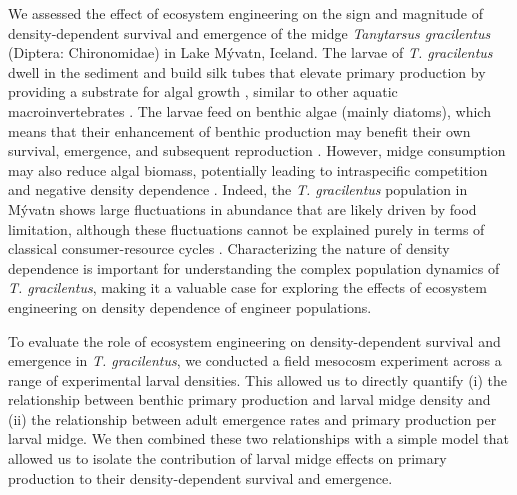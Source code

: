 We assessed the effect of ecosystem engineering on the sign and magnitude
of density-dependent survival and emergence of the midge \emph{Tanytarsus gracilentus} 
(Diptera: Chironomidae) in Lake M\'{y}vatn, Iceland. 
The larvae of \emph{T. gracilentus} dwell in the sediment and build silk tubes that 
elevate primary production by providing a substrate for algal growth 
\citep{herren2017, phillips2019},
similar to other aquatic macroinvertebrates 
\citep{largaespada2012,donadi2014,hoelker2015}.
The larvae feed on benthic algae (mainly diatoms), 
which means that their enhancement of benthic production may benefit their own 
survival, emergence, and subsequent reproduction \citep{ingvason2004}.
However, midge consumption may also reduce algal biomass,
potentially leading to intraspecific competition and negative density dependence 
\citep{einarsson2016}.
Indeed, the \emph{T. gracilentus} population 
in M\'{y}vatn shows large fluctuations in abundance 
that are likely driven by food limitation, although these fluctuations cannot be explained 
purely in terms of classical consumer-resource cycles \citep{ives2008}.
Characterizing the nature of density dependence is important for understanding 
the complex population dynamics of \emph{T. gracilentus},
making it a valuable case for exploring the effects of ecosystem engineering 
on density dependence of engineer populations.

To evaluate the role of ecosystem engineering 
on density-dependent survival and emergence in \emph{T. gracilentus},
we conducted a field mesocosm experiment across a range of experimental larval densities. 
This allowed us to directly quantify
(i) the relationship between benthic primary production and larval midge density and
(ii) the relationship between adult emergence rates and primary production per larval midge.
We then combined these two relationships with a simple model 
that allowed us to isolate the contribution of larval midge effects on 
primary production to their density-dependent survival and emergence.

